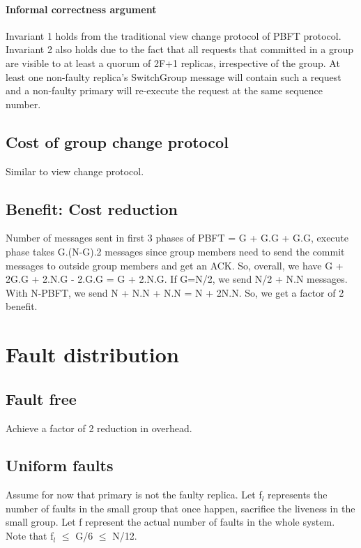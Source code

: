 \documentclass[twocolumn,10pt]{article}
\begin{document}
\paragraph{Informal correctness argument} Invariant 1 holds from the traditional view change
protocol of PBFT protocol. Invariant 2 also holds due to the fact that all requests that 
committed in a group are visible to at least a quorum of 2F+1 replicas, irrespective of the
group. At least one non-faulty replica's SwitchGroup message will contain such a request and
a non-faulty primary will re-execute the request at the same sequence number. 



\subsection{Cost of group change protocol}
Similar to view change protocol.

\subsection{Benefit: Cost reduction}
Number of messages sent in first 3 phases of PBFT = G + G.G + G.G, execute
phase takes G.(N-G).2 messages since group members need to send the commit
messages to outside group members and get an ACK. So, overall, we have
G + 2G.G + 2.N.G - 2.G.G = G + 2.N.G. If G=N/2, we send N/2 + N.N messages.
With N-PBFT, we send N + N.N + N.N = N + 2N.N. So, we get a factor of 2 
benefit. 

\section{Fault distribution}

\subsection{Fault free}
Achieve a factor of 2 reduction in overhead.

\subsection{Uniform faults}
Assume for now that primary is not the faulty replica.
Let f$_{l}$ represents the number of faults in the small group that once happen, sacrifice
the liveness in the small group. Let f represent the actual number of faults in the whole system.
Note that f$_{l}$ $\le$ G/6 $\le$ N/12.
\end{document}
